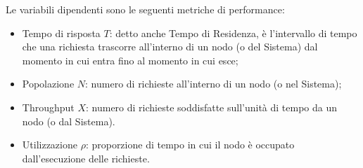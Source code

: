 

Le variabili dipendenti sono le seguenti metriche di performance:
\begin{itemize}
    \item Tempo di risposta $T$: detto anche Tempo di Residenza, è l'intervallo di tempo che una richiesta trascorre all'interno di un nodo (o del Sistema) dal momento in cui entra fino al momento in cui esce;
    \item Popolazione $N$: numero di richieste all'interno di un nodo (o nel Sistema);
    \item Throughput $X$: numero di richieste soddisfatte sull'unità di tempo da un nodo (o dal Sistema). 
    \item Utilizzazione $\rho$: proporzione di tempo in cui il nodo è occupato dall'esecuzione delle richieste.
\end{itemize}